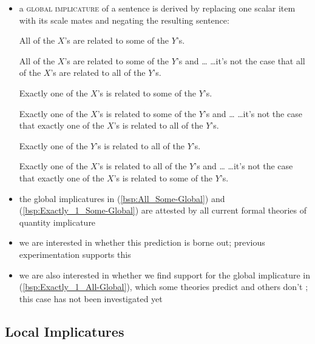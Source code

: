 \documentclass[fleqn,reqno,10pt,draft]{article}
\begin{document}
\begin{itemize}
\item a \textsc{global implicature} of a sentence is derived by
  replacing one scalar item with its scale mates and negating the
  resulting sentence:
  \begin{exe}
    \ex \label{bsp:All_Some-Global} All of the $X$'s are related to some of the $Y$'s.
      \begin{xlist}
      \ex All of the $X$'s are related to some of the $Y$'s and
        \dots 
       \ex \dots it's
        not the case that all of the $X$'s are related to all of the $Y$'s.
      \end{xlist}
    \ex \label{bsp:Exactly_1_Some-Global} Exactly one of the $X$'s is related to some of the $Y$'s.
      \begin{xlist}
        \ex Exactly one of the $X$'s is related to some of the $Y$'s
          and \dots 
        \ex  \dots it's not the case that exactly one of the $X$'s is
          related to all of the $Y$'s.
      \end{xlist}
    \ex \label{bsp:Exactly_1_All-Global} Exactly one of the $Y$'s is related to all of the $Y$'s.
      \begin{xlist}
        \ex Exactly one of the $X$'s is related to all of the $Y$'s
          and \dots 
        \ex  \dots it's not the case that exactly one of the $X$'s is
          related to some of the $Y$'s.
      \end{xlist}
  \end{exe}
\item the global implicatures in (\ref{bsp:All_Some-Global}) and
  (\ref{bsp:Exactly_1_Some-Global}) are attested by all current formal
  theories of quantity implicature
\item we are interested in whether this prediction is borne out;
  previous experimentation supports this
\item we are also interested in whether we find support for the global
  implicature in (\ref{bsp:Exactly_1_All-Global}), which some theories
  predict
  \citep[e.g.][]{Sauerland2004:Scalar-Implicat,Fox2007:Free-Choice-and}
  and others don't \citep{HornDivisionofLabor1984}; this case has not been
  investigated yet
\end{itemize}



\subsection{Local Implicatures}
\label{sec:local-implicatures}
\end{document}
